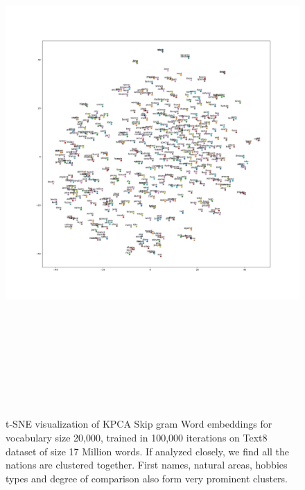 \begin{figure}[H]
	\hskip-2cm
	\includegraphics[width=20cm,height=20cm,keepaspectratio]{files/enText8-20kExtendedVocab/text8V20000.png}
	\caption{t-SNE visualization of KPCA Skip gram Word embeddings for vocabulary size 20,000, trained in 100,000 iterations on Text8 dataset of size 17 Million words. If analyzed closely, we find all the nations are clustered together. First names, natural areas, hobbies types and degree of comparison also form very prominent clusters.}
	\label{fig:tsnee2}
\end{figure}
